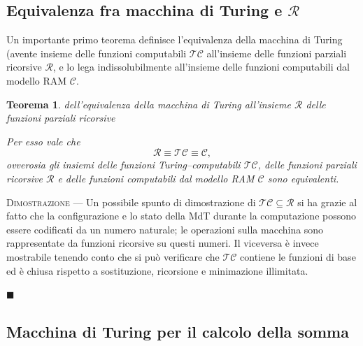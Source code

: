 \documentclass[10pt]{\classname}
\newtheorem{thm}{Teorema}
\begin{document}
\subsection{Equivalenza fra macchina di Turing e $\mathcal R$}

Un importante primo teorema definisce l'equivalenza della macchina di Turing (avente
insieme delle funzioni computabili $\mathcal{TC}$ all'insieme delle funzioni
parziali ricorsive $\mathcal R$, e lo lega indissolubilmente all'insieme delle
funzioni computabili dal modello RAM $\mathcal C$.


\begin{thm}{dell'equivalenza della macchina di Turing all'insieme $\mathcal R$ delle funzioni parziali ricorsive}

    Per esso vale che
    $$\mathcal R \equiv \mathcal {TC} \equiv \mathcal C,$$ ovverosia gli
    insiemi delle funzioni Turing--computabili $\mathcal{TC}$, delle funzioni
    parziali ricorsive $\mathcal R$ e delle funzioni computabili dal modello
    RAM $\mathcal C$ sono \emph{equivalenti}.
\end{thm}

\textsc{Dimostrazione} --- Un possibile spunto di dimostrazione di $\mathcal {TC} \subseteq \mathcal R$ si
ha grazie al fatto che la configurazione e lo stato della MdT durante la
computazione possono essere codificati da un numero naturale; le operazioni
sulla macchina sono rappresentate da funzioni ricorsive su questi numeri. Il
viceversa è invece mostrabile tenendo conto che si può verificare che
$\mathcal{TC}$ contiene le funzioni di base ed è chiusa rispetto a sostituzione,
ricorsione e minimazione illimitata.

\begin{flushright}
$\blacksquare$
\end{flushright}



\subsection{Macchina di Turing per il calcolo della somma}
\end{document}
